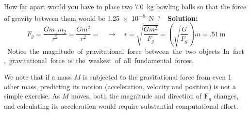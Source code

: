 \begin{example}
  How far apart would you have to place two \SI{7.0}{\kilo\gram} bowling balls
  so that the force of gravity between them would be \SI{1.25e-8}\newton?

  \vspace{.15in}\textbf{Solution:}
  \begin{equation*}
    F_g=\frac{Gm_1m_2}{r^2}=\frac{Gm^2}{r^2}=\quad\rightarrow\quad
    r=\sqrt{\frac{Gm^2}{F_g}}=\left(\sqrt{\frac G{F_g}}\right)m=
    \boxed{\SI{.51}\metre}
  \end{equation*}
  Notice the magnitude of gravitational force between the two objects. In fact,
  gravitational force is the weakest of all fundamental forces.
\end{example}

We note that if a mass $M$ is subjected to the gravitational force from even
1 other mass, predicting its motion (acceleration, velocity and position) is
not a simple exercise. As $M$ moves, both the magnitude and direction of
$\bm F_g$ changes, and calculating its acceleration would require substantial 
computational effort.



